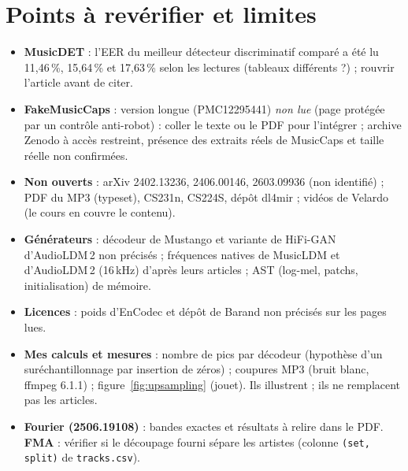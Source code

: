 \documentclass[10pt,a4paper]{article}
\begin{document}
\normalsize

\section{Points à revérifier et limites}\label{app:verif}
\footnotesize
\begin{itemize}[itemsep=0.5pt,topsep=1pt]
  \item \textbf{MusicDET} : l'EER du meilleur détecteur discriminatif comparé a été lu 11,46\,\%, 15,64\,\% et 17,63\,\% selon les lectures (tableaux différents ?) ; rouvrir l'article avant de citer.
  \item \textbf{FakeMusicCaps} : version longue (PMC12295441) \emph{non lue} (page protégée par un contrôle anti-robot) : coller le texte ou le PDF pour l'intégrer ; archive Zenodo à accès restreint, présence des extraits réels de MusicCaps et taille réelle non confirmées.
  \item \textbf{Non ouverts} : arXiv 2402.13236, 2406.00146, 2603.09936 (non identifié) ; PDF du MP3 (typeset), CS231n, CS224S, dépôt dl4mir ; vidéos de Velardo (le cours en couvre le contenu).
  \item \textbf{Générateurs} : décodeur de Mustango et variante de HiFi-GAN d'AudioLDM\,2 non précisés ; fréquences natives de MusicLDM et d'AudioLDM\,2 (16\,kHz) d'après leurs articles ; AST (log-mel, patchs, initialisation) de mémoire.
  \item \textbf{Licences} : poids d'EnCodec et dépôt de Barand non précisés sur les pages lues.
  \item \textbf{Mes calculs et mesures} : nombre de pics par décodeur (hypothèse d'un suréchantillonnage par insertion de zéros) ; coupures MP3 (bruit blanc, ffmpeg 6.1.1) ; figure~\ref{fig:upsampling} (jouet). Ils illustrent ; ils ne remplacent pas les articles.
  \item \textbf{Fourier (2506.19108)} : bandes exactes et résultats à relire dans le PDF. \textbf{FMA} : vérifier si le découpage fourni sépare les artistes (colonne \texttt{(set, split)} de \texttt{tracks.csv}).
\end{itemize}
\normalsize

\end{document}
